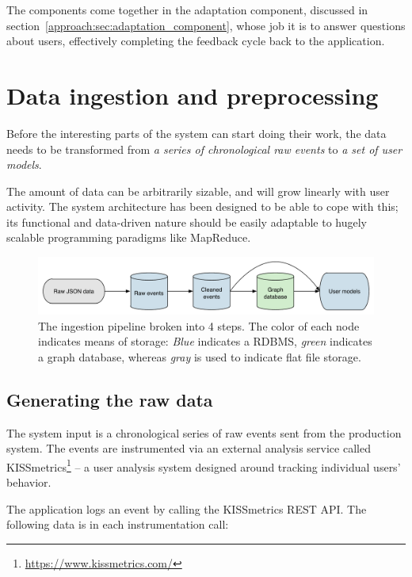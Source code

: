 The components come together in the adaptation component, discussed in section~\ref{approach:sec:adaptation_component}, whose job it is to answer questions about users, effectively completing the feedback cycle back to the application.


\section{Data ingestion and preprocessing} %
\label{approach:sec:data_ingestion_and_preprocessing}

Before the interesting parts of the system can start doing their work, the data needs to be transformed from \emph{a series of chronological raw events} to \emph{a set of user models}.

The amount of data can be arbitrarily sizable, and will grow linearly with user activity. The system architecture has been designed to be able to cope with this; its functional and data-driven nature should be easily adaptable to hugely scalable programming paradigms like MapReduce.

\begin{figure}[h]
  \centering
    \includegraphics[width=\textwidth]{Figures/ingestion-pipeline}
  \caption{The ingestion pipeline broken into 4 steps. The color of each node indicates means of storage: \emph{Blue} indicates a RDBMS, \emph{green} indicates a graph database, whereas \emph{gray} is used to indicate flat file storage.}
  \label{fig:ingestion-pipeline}
\end{figure}

\subsection{Generating the raw data}
\label{approach:sub:generating_data}

The system input is a chronological series of raw events sent from the production system. The events are instrumented via an external analysis service called KISSmetrics\footnote{\url{https://www.kissmetrics.com/}} -- a user analysis system designed around tracking individual users' behavior.

The application logs an event by calling the KISSmetrics REST API. The following data is in each instrumentation call:

